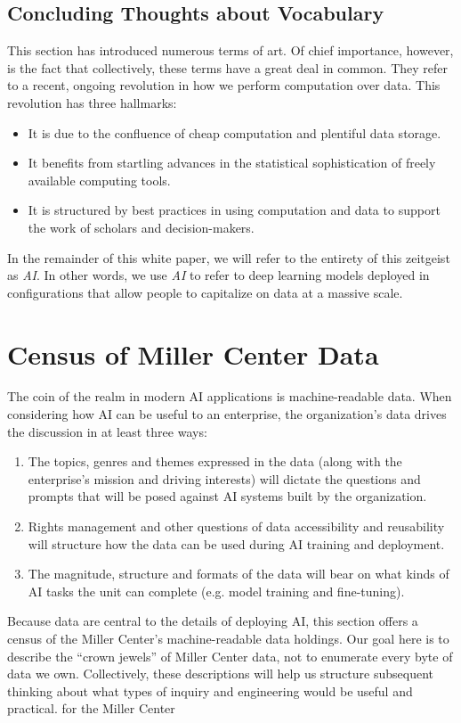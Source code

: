 \documentclass[12pt, oneside]{article}   	%
\begin{document}
 


\subsection{Concluding Thoughts about Vocabulary}\label{section.definitions.closing}
This section has introduced numerous terms of art.  Of chief importance, however, is the fact that collectively, these terms have a great deal in common.  They refer to a recent, ongoing revolution in how we perform computation over data.  This revolution has three hallmarks:
\begin{itemize}
\item It is due to the confluence of cheap computation and plentiful data storage.
\item It benefits from startling advances in the statistical sophistication of freely available computing tools.
\item It is structured by best practices in using computation and data to support the work of scholars and decision-makers.
\end{itemize}
In the remainder of this white paper, we will  refer to the entirety of this zeitgeist as \emph{AI}.  In other words, we use \emph{AI} to refer to deep learning models deployed in configurations that allow people to capitalize on data at a massive scale.


\section{Census of Miller Center Data}\label{section.data}
The coin of the realm in modern AI applications is machine-readable data.  When considering how AI can be useful to an enterprise, the organization’s data drives the discussion in at least three ways:
\begin{enumerate}
\item The topics, genres and themes expressed in the data (along with the enterprise's mission and driving interests) will dictate the questions and prompts that will be posed against AI systems built by the organization.
\item Rights management and other questions of data accessibility and reusability will structure how the data can be used during AI training and deployment.
\item The magnitude, structure and formats of the data will bear on what kinds of AI tasks the unit can complete (e.g. model training and fine-tuning).
\end{enumerate}
Because data are central to the details of deploying AI, this section offers a census of the Miller Center’s machine-readable data holdings.  Our goal here is to describe the “crown jewels” of Miller Center data, not to enumerate every byte of data we own.  Collectively, these descriptions will help us structure subsequent thinking about what types of inquiry and engineering would be useful and practical. for the Miller Center
\end{document}
